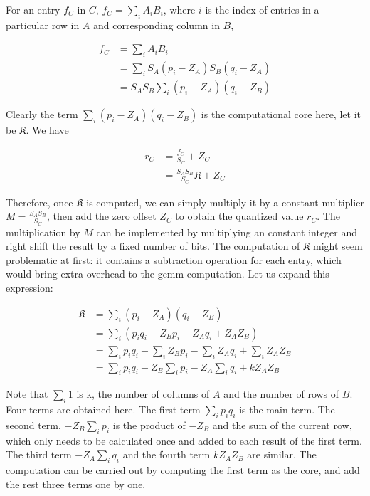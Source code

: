 For an entry $f_C$ in $C$, $f_C = \sum_{i}^{} A_i B_i$, where $i$ is the index of entries in a particular
row in $A$ and corresponding column in $B$,

\begin{equation}
\begin{split}
  f_C & = \sum_{i} A_i B_i \\
      & = \sum_{i} S_A (p_i - Z_A) S_B (q_i - Z_A) \\
      & = S_A S_B \sum_{i} (p_i - Z_A) (q_i - Z_B)
\end{split}
\end{equation}

Clearly the term $\sum_{i} (p_i - Z_A) (q_i - Z_B)$ is the computational core here, let it be
$\mathfrak{K}$. We have

\begin{equation}
\begin{split}
  r_C & = \frac{f_C}{S_C} + Z_C \\
      & = \frac{S_A S_B}{S_C} \mathfrak{K} + Z_C
\end{split}
\end{equation}

Therefore, once $\mathfrak{K}$ is computed, we can simply multiply it by a constant multiplier
$M = \frac{S_A S_B}{S_C}$, then add the zero offset $Z_C$ to obtain the quantized value $r_C$. The
multiplication by $M$ can be implemented by multiplying an constant integer and right shift the
result by a fixed number of bits. The computation of $\mathfrak{K}$ might seem problematic at first:
it contains a subtraction operation for each entry,
which would bring extra overhead to the \gls{gemm} computation. Let us expand this expression:

\begin{equation}
\begin{split}
  \mathfrak{K} & = \sum_{i} (p_i - Z_A) (q_i - Z_B) \\
               & = \sum_{i} (p_i q_i - Z_B p_i - Z_A q_i + Z_A Z_B) \\
               & = \sum_{i} p_i q_i - \sum_{i} Z_B p_i - \sum_{i} Z_A q_i + \sum_{i} Z_A Z_B \\
               & = \sum_{i} p_i q_i - Z_B \sum_{i} p_i - Z_A \sum_{i} q_i + k Z_A Z_B
\end{split}
\end{equation}

Note that $\sum_{i} 1$ is k, the number of columns of $A$ and the number of rows of $B$. Four terms are
obtained here. The first term $\sum_{i} p_i q_i$ is the main term. The second term, $- Z_B \sum_{i} p_i$
is the product of $- Z_B$ and the sum of the current row, which only needs to be calculated once and added
to each result of the first term. The third term $- Z_A \sum_{i} q_i$ and the fourth term $k Z_A Z_B$ are
similar. The computation can be carried out by computing the first term as the core, and add the rest three
terms one by one.

